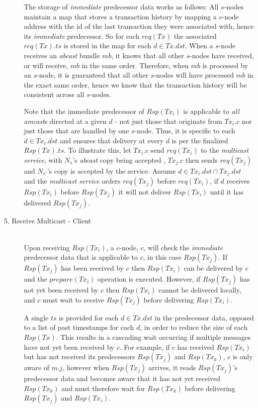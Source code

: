 \begin{description}
		The storage of \emph{immediate} predecessor data works as follows: All $s$-nodes maintain a map that stores a transaction history by mapping a $c$-node address with the id of the last transaction they were associated with, hence its \emph{immediate} predecessor.  So for each $req(Tx)$ the associated $req(Tx).ts$ is stored in the map for each $d \in Tx.dst$. When a $s$-node receives an \emph{abcast} bundle $mb$, it knows that all other $s$-nodes have received, or will receive, $mb$ in the same order.  Therefore, when $mb$ is processed by an $s$-node, it is guaranteed that all other $s$-nodes will have processed $mb$ in the exact same order, hence we know that the transaction history will be consistent across all $s$-nodes.  
		
		Note that the immediate predecessor of $Rsp(Tx_i)$ is applicable to \emph{all} \emph{amcast}s directed at a given $d$ - not just those that originate from $Tx_i.c$ nor just those that are handled by one $s$-node. Thus, it is specific to each $d \in Tx_i.dst$ and ensures that delivery at every $d$ is per the finalized $Rsp(Tx).ts$. To illustrate this, let $Tx_i.c$ send $req(Tx_i)$ to the \emph{multicast service}, with $N_s$'s \emph{abcast} copy being accepted , $Tx_j.c$ then sends $req(Tx_j)$ and $N_{s'}$'s copy is accepted by the service.  Assume $d \in Tx_i.dst \cap Tx_j.dst$ and the \emph{multicast service} orders $req(Tx_j)$ before $req(Tx_i)$, if $d$ receives $Rsp(Tx_i)$ before $Rsp(Tx_j)$ it will not deliver $Rsp(Tx_i)$ until it has delivered $Rsp(Tx_j)$.
    
    \item[5. Receive Multicast - Client] \hfill \\
    Upon receiving $Rsp(Tx_i)$, a $c$-node, $c$, will check the \emph{immediate} predecessor data that is applicable to $c$, in this case $Rsp(Tx_j)$.  If $Rsp(Tx_j)$ has been received by $c$ then $Rsp(Tx_i)$ can be delivered by $c$ and the $prepare(Tx_i)$ operation is executed.  However, if $Rsp(Tx_j)$ has not yet been received by $c$ then $Rsp(Tx_i)$ cannot be delivered locally, and $c$ must wait to receive $Rsp(Tx_j)$ before delivering $Rsp(Tx_i)$.  
    
    A single $ts$ is provided for each $d \in Tx.dst$ in the predecessor data, opposed to a list of past timestamps for each $d$, in order to reduce the size of each $Rsp(Tx)$.  This results in a cascading wait occurring if multiple messages have not yet been received by $c$.  For example, if $c$ has received $Rsp(Tx_i)$ but has not received its predecessors $Rsp(Tx_j)$ and $Rsp(Tx_k)$, $c$ is only aware of $m.j$, however when $Rsp(Tx_j)$ arrives, it reads $Rsp(Tx_j)$'s predecessor data and becomes aware that it has not yet received $Rsp(Tx_k)$ and must therefore wait for $Rsp(Tx_k)$ before delivering $Rsp(Tx_j)$ and $Rsp(Tx_i)$.  
    
   	\end{description}

